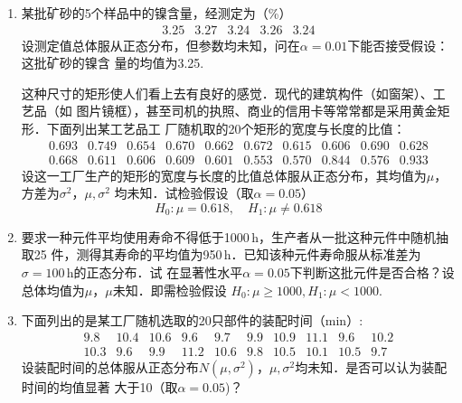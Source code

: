 \documentclass[10pt,a4paper]{article}
\begin{document}
\begin{enumerate}


    \item 某批矿砂的5个样品中的镍含量，经测定为（\%）
    $$\begin{array}{ccccc}
        3.25 & 3.27 &  3.24 & 3.26 & 3.24
    \end{array}$$
    设测定值总体服从正态分布，但参数均未知，问在$\alpha=0.01$下能否接受假设：这批矿砂的镍含
    量的均值为3.25.


    这种尺寸的矩形使人们看上去有良好的感觉．现代的建筑构件（如窗架）、工艺品（如
    图片镜框），甚至司机的执照、商业的信用卡等常常都是采用黄金矩形．下面列出某工艺品工
    厂随机取的20个矩形的宽度与长度的比值：
    $$\begin{array}{cccccccccc}
        0.693 & 0.749 & 0.654 & 0.670 & 0.662  & 0.672 &  0.615 &  0.606 & 0.690 & 0.628\\
        0.668 & 0.611 & 0.606 & 0.609  & 0.601 & 0.553 & 0.570  & 0.844 &  0.576 &  0.933 
    \end{array}$$
    设这一工厂生产的矩形的宽度与长度的比值总体服从正态分布，其均值为$\mu$，方差为$\sigma^2$，$\mu,\sigma^2$
    均未知．试检验假设（取$\alpha=0.05$）
    $$H_0:\mu=0.618,\quad H_1:\mu\neq 0.618$$






    \item 要求一种元件平均使用寿命不得低于1000$\, \mathrm{h}$，生产者从一批这种元件中随机抽取25
    件，测得其寿命的平均值为950$\, \mathrm{h}$．已知该种元件寿命服从标准差为$\sigma=100\, \mathrm{h}$的正态分布．试
    在显著性水平$\alpha=0.05$下判断这批元件是否合格？设总体均值为$\mu$，$\mu$未知．即需检验假设
    $H_0:\mu\geq 1000,H_1:\mu<1000$.




    \item 下面列出的是某工厂随机选取的20只部件的装配时间（min）:
    $$\begin{array}{cccccccccc}
        9.8 &  10.4 &  10.6 &  9.6 &  9.7 &  9.9  & 10.9 &  11.1 &  9.6 &  10.2\\
        10.3 &  9.6 &  9.9 &  11.2 &  10.6 &  9.8  &  10.5 &  10.1 &  10.5 &  9.7
    \end{array}$$
    设装配时间的总体服从正态分布$N(\mu,\sigma^2)$，$\mu,\sigma^2$均未知．是否可以认为装配时间的均值显著
    大于10（取$\alpha=0.05$)？






\end{enumerate}
\end{document}
